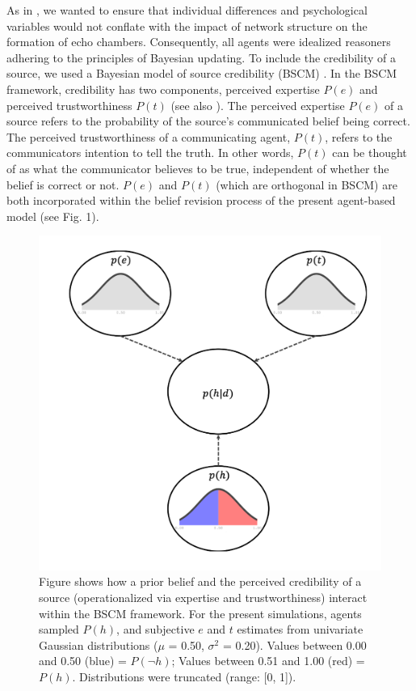 \documentclass[doc,floatsintext]{apa6}
\begin{document}
As in \cite{madsen2017growing, madsen2018large}, we wanted to ensure that individual differences and psychological variables would not conflate with the impact of network structure on the formation of echo chambers. Consequently, all agents were idealized reasoners adhering to the principles of Bayesian updating. To include the credibility of a source, we used a Bayesian model of source credibility (BSCM) \citep{bovens2003bayesian, hahn2009argument, harris2009bayesian}. In the BSCM framework, credibility has two components, perceived expertise \(P(e)\) and perceived trustworthiness \(P(t)\) (see also \cite{harris2016appeal}). The perceived expertise \(P(e)\) of a source refers to the probability of the source's communicated belief being correct. The perceived trustworthiness of a communicating agent, \(P(t)\), refers to the communicators intention to tell the truth. In other words, \(P(t)\) can be thought of as what the communicator believes to be true, independent of whether the belief is correct or not. \(P(e)\) and \(P(t)\) (which are orthogonal in BSCM) are both incorporated within the belief revision process of the present agent-based model (see Fig. 1).



\begin{figure}[!t]
\centering
\includegraphics[width=1\columnwidth]{img/bscm_update_2.png}
\caption{Figure shows how a prior belief and the perceived credibility of a source (operationalized via expertise and trustworthiness) interact within the BSCM framework. For the present simulations, agents sampled \(P(h)\), and subjective \(e\) and \(t\) estimates from univariate Gaussian distributions (\(\mu\) = 0.50, \(\sigma^2\) = 0.20). Values between 0.00 and 0.50 (blue) =  \(P(\neg h)\); Values between 0.51 and 1.00 (red) =  \(P(h)\). Distributions were truncated (range: [0, 1]).} 
\label{fig:rich_vis}
\end{figure}
\end{document}
